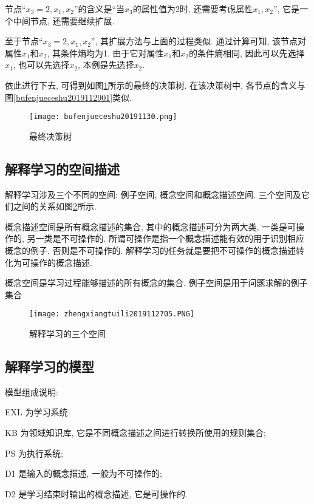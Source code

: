 节点“$x_3=2, x_1,x_2$”的含义是“当$x_3$的属性值为2时, 还需要考虑属性$x_1,x_2$”, 它是一个中间节点, 还需要继续扩展.

至于节点“$x_3=2, x_1,x_2$”, 其扩展方法与上面的过程类似. 通过计算可知, 该节点对属性$x_1$和$x_2$, 其条件熵均为1. 由于它对属性$x_1$和$x_2$的条件熵相同, 因此可以先选择$x_1$, 也可以先选择$x_2$, 本例是先选择$x_2$.

依此进行下去, 可得到如图\ref{bufenjueceshu2019112902}所示的最终的决策树. 在该决策树中, 各节点的含义与图\ref{bufenjueceshu2019112901}类似.
\begin{figure}[H]
\centering
\texttt{[image: bufenjueceshu20191130.png]}
\caption{最终决策树}
\label{bufenjueceshu2019112902}
\end{figure}
\subsection{解释学习的空间描述}
解释学习涉及三个不同的空间: 例子空间, 概念空间和概念描述空间. 三个空间及它们之间的关系如图\ref{AI32fig2705}所示.

概念描述空间是所有概念描述的集合, 其中的概念描述可分为两大类, 一类是可操作的, 另一类是不可操作的. 所谓可操作是指一个概念描述能有效的用于识别相应概念的例子. 否则是不可操作的. 解释学习的任务就是要把不可操作的概念描述转化为可操作的概念描述.

概念空间是学习过程能够描述的所有概念的集合. 例子空间是用于问题求解的例子集合
\begin{figure}[H]
\centering
\texttt{[image: zhengxiangtuili2019112705.PNG]}
\caption{解释学习的三个空间}
\label{AI32fig2705}
\end{figure}
\subsection{解释学习的模型}
模型组成说明:

EXL 为学习系统

KB 为领域知识库, 它是不同概念描述之间进行转换所使用的规则集合;

PS 为执行系统;

D1 是输入的概念描述, 一般为不可操作的;

D2 是学习结束时输出的概念描述, 它是可操作的.

